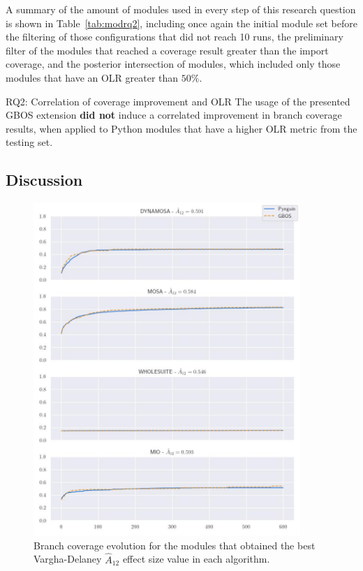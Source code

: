 \documentclass[%
  chapterprefix=false,%
  open=right,%
  twoside=true,%
  paper=a4,%
  logofile={Figures/logo.png},%
  thesistype=master,%
  UKenglish,%
]{se2thesis}
\begin{document}
A summary of the amount of modules used in every step of this research question is shown in Table~\ref{tab:modrq2}, including once again the initial module set before the filtering of those configurations that did not reach 10 runs, the preliminary filter of the modules that reached a coverage result greater than the import coverage, and the posterior intersection of modules, which included only those modules that have an OLR greater than \(50\%\).

\begin{table}[t]
  \centering
  
\caption{Amount of modules used while analysing each experimental configuration for the answering of Research Question 2.}\label{tab:modrq2}
\end{table}

\begin{summary}{RQ2: Correlation of coverage improvement and OLR}
  The usage of the presented GBOS extension \textbf{did not} induce a correlated improvement in branch coverage results, when applied to Python modules that have a higher OLR metric from the testing set.
\end{summary}

\subsection*{Discussion}

\begin{figure}[ptbh]
  \centering
  \includegraphics[width=0.9\textwidth]{Figures/Results/bestA12.jpg}
  \caption{Branch coverage evolution for the modules that obtained the best Vargha-Delaney \(\hat{A}_{12}\) effect size value in each algorithm.}\label{fig:besta12}
\end{figure}
\end{document}
